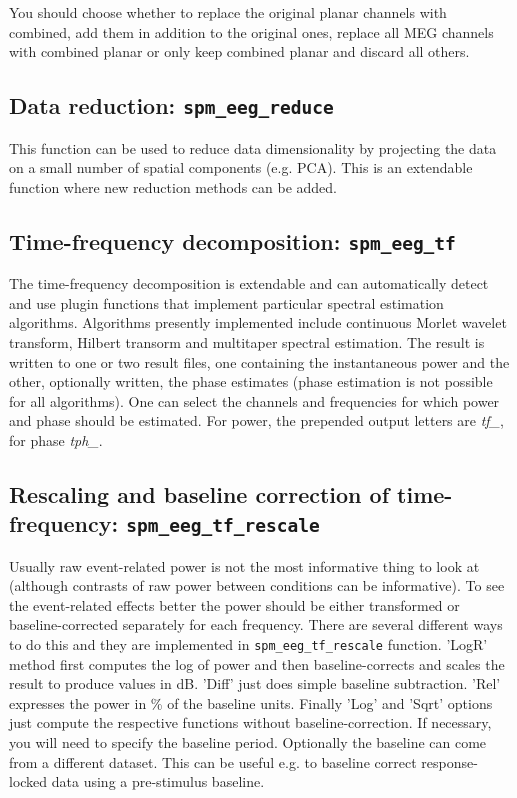 You should choose whether to replace the original planar channels with combined, add them in addition to the original ones, replace all MEG channels with combined planar or only keep combined planar and discard all others. 

\subsection{Data reduction: \texttt{spm\_eeg\_reduce}}
This function can be used to reduce data dimensionality by projecting the data on a small number of spatial components (e.g. PCA). This is an extendable function where new reduction methods can be added.

\subsection{Time-frequency decomposition: \texttt{spm\_eeg\_tf}\label{sec:tf}}
The time-frequency decomposition is extendable and can automatically detect and use plugin functions that implement particular spectral estimation algorithms. Algorithms presently implemented include continuous Morlet wavelet transform, Hilbert transorm and multitaper spectral estimation. The result is written to one or two result files, one containing the instantaneous power and the other, optionally written, the phase estimates (phase estimation is not possible for all algorithms). One can select the channels and frequencies for which power and phase should be estimated. For power, the prepended output letters are \textit{tf\_}, for phase \textit{tph\_}.

\subsection{Rescaling and baseline correction of time-frequency: \texttt{spm\_eeg\_tf\_rescale}\label{sec:tfrescale}}
Usually raw event-related power is not the most informative thing to look at (although contrasts of raw power between conditions can be informative). To see the event-related effects better the power should be either transformed or baseline-corrected separately for each frequency. There are several different ways to do this and they are implemented in \texttt{spm\_eeg\_tf\_rescale} function. 'LogR' method first computes the log of power and then baseline-corrects and scales the result to produce values in dB. 'Diff' just does simple baseline subtraction. 'Rel' expresses the power in \% of the baseline units. Finally 'Log' and 'Sqrt' options just compute the respective functions without baseline-correction. If necessary, you will need to specify the baseline period. Optionally the baseline can come from a different dataset. This can be useful e.g. to baseline correct response-locked data using a pre-stimulus baseline. 

